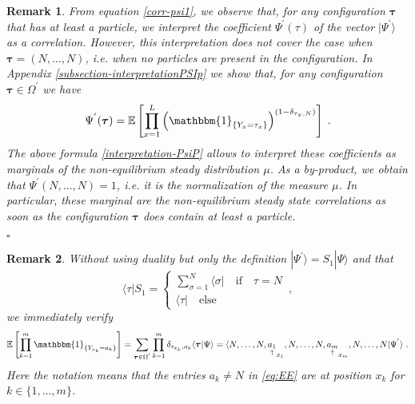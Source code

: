 \documentclass[10pt]{article}
\numberwithin{equation}{section}
\numberwithin{equation}{subsection}
\newtheorem{remark}{Remark}
\newcommand{\dt}{\;.}
\begin{document}
{\color{blue}\begin{remark}
From equation \eqref{corr-psi1}, we observe that, for any configuration $\bm{\tau}$ that has at least a particle, we interpret the coefficient $\Psi^{'}(\tau)$ of the vector $|\Psi^{'}\rangle$ as a correlation. However, this interpretation does not cover the case when $\bm{\tau}=(N,\ldots,N)$, i.e. when no particles are present in the configuration. In Appendix \ref{subsection-interpretationPSIp} we show that, for any configuration $\bm{\tau}\in \Omega^{'}$ we have 
\begin{equation}\label{interpretation-PsiP}
	\Psi^{'}(\bm{\tau})=\mathbb{E}\left[\prod_{x=1}^{L}\left(\mathbbm{1}_{\{Y_{x}=\tau_{x}\}} \right)^{(1-\delta_{\tau_{x},N})}\right]\dt
\end{equation} 
The above formula \eqref{interpretation-PsiP} allows to interpret these coefficients as marginals of the non-equilibrium steady distribution $\mu$. As a by-product, we obtain that $\Psi^{'}(N,\ldots,N)=1$, i.e. it is the normalization of the measure $\mu$. In particular, these marginal are the non-equilibrium steady state correlations as soon as the configuration $\bm{\tau}$ does contain at least a particle. 
\end{remark} }
\begin{flushright}
	$\square$
\end{flushright}


\begin{remark} 
Without using duality but only  the definition $|\Psi^{'}\rangle=S_1|\Psi\rangle$ and that
\begin{equation}
 \langle \tau |S_1=\begin{cases}
                    \sum_{\sigma=1}^N\langle \sigma|  \quad\text{if}\quad \tau=N\\
                    \langle \tau| \quad\text{else} 
                   \end{cases}\,,
\end{equation} 
  we immediately verify 
\begin{equation}\label{eq:EE}
\begin{split}
\mathbb{E}\left[\prod_{k=1}^{m}\mathbbm{1}_{\{Y_{x_{k}}=a_{k}\}}\right]=\sum_{\bm{\tau}\in\Omega^{'}}\prod_{k=1}^{m}\delta_{{{\tau}_{x_k}},a_{k}}\langle \bm{\tau}|\Psi\rangle=
\langle N,\ldots,N,\underset{\uparrow}{a_1}_{x_{1}},N,\ldots,N,\underset{\uparrow}{a_m}_{x_{m}},N,\ldots,N|\Psi^{'}\rangle\dt
 \end{split}
\end{equation} 
{\color{blue}Here the notation means that the entries $a_k\neq N$ in \eqref{eq:EE} are at position $x_k$ for $k\in\{1,\ldots,m\}$.} 
\end{remark}
 
\end{document}
